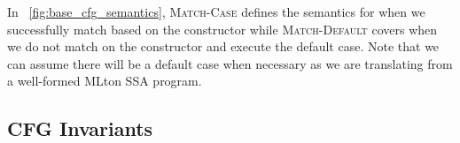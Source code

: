 \documentclass{article}
\begin{document}
In ~\ref{fig:base_cfg_semantics}, \textsc{Match-Case} defines the semantics for when we successfully match based on the constructor while \textsc{Match-Default} covers when we do not match on the constructor and execute the default case. Note that we can assume there will be a default case when necessary as we are translating from a well-formed MLton SSA program.

\subsection{CFG Invariants}




\end{document}
